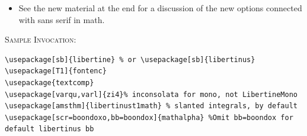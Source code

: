 \documentclass{article}
\begin{document}
\begin{itemize}
\begin{itemize}
 \item the {\tt scaled} option to {\tt libertinust1math} overrides all other scale settings;
\item if you did not issue a {\tt scale} or {\tt scaled} option to {\tt libertinust1math}, then
\begin{itemize}
\item
if you used a {\tt libertine} package that set a value for \verb|\LinuxLibertineT@scale|, then its value is used;
\item otherwise, if you used {\tt libertinus-type1} or {\tt libertinus}, then the value of \verb|\LibertinusRM@scale| is used.
\end{itemize}
 \end{itemize}
\item See the new material at the end for a discussion of the new options connected with sans serif in math.
\end{itemize}

\textsc{Sample Invocation:}
\begin{verbatim}
\usepackage[sb]{libertine} % or \usepackage[sb]{libertinus}
\usepackage[T1]{fontenc}
\usepackage{textcomp}
\usepackage[varqu,varl]{zi4}% inconsolata for mono, not LibertineMono
\usepackage[amsthm]{libertinust1math} % slanted integrals, by default
\usepackage[scr=boondoxo,bb=boondox]{mathalpha} %Omit bb=boondox for default libertinus bb
\end{verbatim}
\end{document}
